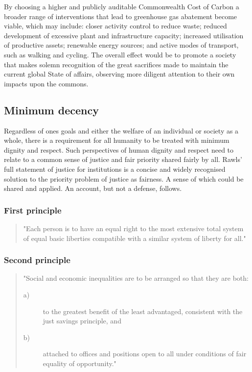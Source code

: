 \documentclass[11pt, oneside]{article}   	%
\begin{document}
By choosing a higher and publicly auditable Commonwealth Cost of Carbon a broader range of interventions that lead to greenhouse gas abatement become viable, which may include: closer activity control to reduce waste; reduced development of excessive plant and infrastructure capacity; increased utilisation of productive assets; renewable energy sources; and active modes of transport, such as walking and cycling.
The overall effect would be to promote a society that makes solemn recognition of the great sacrifices made to maintain the current global State of affairs, observing more diligent attention to their own impacts upon the commons.\

\subsection{Minimum decency}
Regardless of ones goals and either the welfare of an individual or society as a whole, there is a requirement for all humanity to be treated with minimum dignity and respect.
Such perspectives of human dignity and respect need to relate to a common sense of justice and fair priority shared fairly by all.
Rawls'~\cite{jr1} full statement of justice for institutions is a concise and widely recognised solution to the priority problem of justice as fairness.
A sense of which could be shared and applied.
An account, but not a defense, follows.

\subsubsection{First principle}

\begin{quote}
"Each person is to have an equal right to the most extensive total system of equal basic liberties compatible with a similar system of liberty for all."
\end{quote}

\subsubsection{Second principle}

\begin{quote}
"Social and economic inequalities are to be arranged so that they are both:
\begin{description}
\item[ a)] to the greatest benefit of the least advantaged, consistent with the just savings principle, and
\item[ b)] attached to offices and positions open to all under conditions of fair equality of opportunity."
\end{description}
\end{quote}
\end{document}
